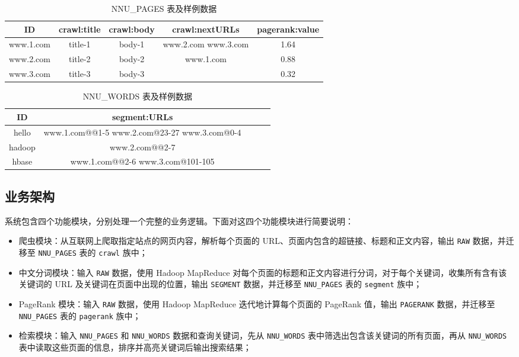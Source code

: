 \documentclass{ctexart}
\newcommand{\code}[1]{\colorbox{backcolor}{\lstinline|#1|}}
\begin{document}
    \begin{table}[h]
        \centering
        \caption{NNU\_PAGES 表及样例数据}
        \label{tab:archicture_nnu-pages}
        \begin{tabular}{c|cccc}
            \hline
            ID        & crawl:title & crawl:body & crawl:nextURLs      & pagerank:value \\ \hline
            www.1.com & title-1     & body-1     & www.2.com www.3.com & 1.64           \\
            www.2.com & title-2     & body-2     & www.1.com           & 0.88           \\
            www.3.com & title-3     & body-3     &                     & 0.32           \\ \hline
        \end{tabular}
    \end{table}

    \begin{table}[h]
        \centering
        \caption{NNU\_WORDS 表及样例数据}
        \label{tab:archicture_nnu-words}
        \begin{tabular}{c|cccc}
            \hline
            ID     & segment:URLs                                 \\ \hline
            hello  & www.1.com@@1-5 www.2.com@23-27 www.3.com@0-4 \\
            hadoop & www.2.com@@2-7                               \\
            hbase  & www.1.com@@2-6 www.3.com@101-105             \\ \hline
        \end{tabular}
    \end{table}

    \subsection{业务架构}\label{subsec:archicture_modules}

    系统包含四个功能模块，分别处理一个完整的业务逻辑。下面对这四个功能模块进行简要说明：

    \begin{itemize}
        \item 爬虫模块：从互联网上爬取指定站点的网页内容，解析每个页面的 URL、页面内包含的超链接、标题和正文内容，输出 \code{RAW} 数据，并迁移至 \code{NNU_PAGES} 表的 \code{crawl} 族中；
        \item 中文分词模块：输入 \code{RAW} 数据，使用 Hadoop MapReduce 对每个页面的标题和正文内容进行分词，对于每个关键词，收集所有含有该关键词的 URL 及关键词在页面中出现的位置，输出 \code{SEGMENT} 数据，并迁移至 \code{NNU_PAGES} 表的 \code{segment} 族中；
        \item PageRank 模块：输入 \code{RAW} 数据，使用 Hadoop MapReduce 迭代地计算每个页面的 PageRank 值，输出 \code{PAGERANK} 数据，并迁移至 \code{NNU_PAGES} 表的 \code{pagerank} 族中；
        \item 检索模块：输入 \code{NNU_PAGES} 和 \code{NNU_WORDS} 数据和查询关键词，先从 \code{NNU_WORDS} 表中筛选出包含该关键词的所有页面，再从 \code{NNU_WORDS} 表中读取这些页面的信息，排序并高亮关键词后输出搜索结果；
    \end{itemize}
\end{document}
